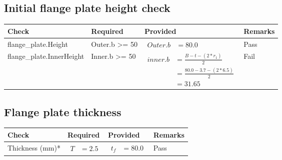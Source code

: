 \documentclass{article}%
\begin{document}
%
\newpage%
\subsection{Initial flange plate height check}%
\label{subsec:Initialflangeplateheightcheck}%
\renewcommand{\arraystretch}{1.2}%
\begin{longtable}{|p{4.5cm}|p{2.5cm}|p{7cm}|p{1.5cm}|}%
\hline%
\rowcolor{OsdagGreen}%
Check&Required&Provided&Remarks\\%
\hline%
\endhead%
\hline%
flange\_plate.Height&Outer.b >= 50&$\begin{aligned} Outer.b &=80.0\end{aligned}$&Pass\\%
\hline%
flange\_plate.InnerHeight&Inner.b >= 50&$\begin{aligned} inner.b &= \frac{B-t-(2*r_1)}{2}\\ &=\frac{80.0-3.7-(2*6.5)}{2}\\ &= 31.65\end{aligned}$&Fail\\%
\hline%
\end{longtable}

%
\newpage%
\subsection{Flange plate thickness}%
\label{subsec:Flangeplatethickness}%
\renewcommand{\arraystretch}{1.2}%
\begin{longtable}{|p{2.5cm}|p{4.5cm}|p{7cm}|p{1.5cm}|}%
\hline%
\rowcolor{OsdagGreen}%
Check&Required&Provided&Remarks\\%
\hline%
\endhead%
\hline%
Thickness (mm)*&$\begin{aligned} T &=2.5\end{aligned}$&$\begin{aligned} t_f &=80.0\end{aligned}$&Pass\\%
\hline%
\end{longtable}

%
\newpage%
\end{document}

